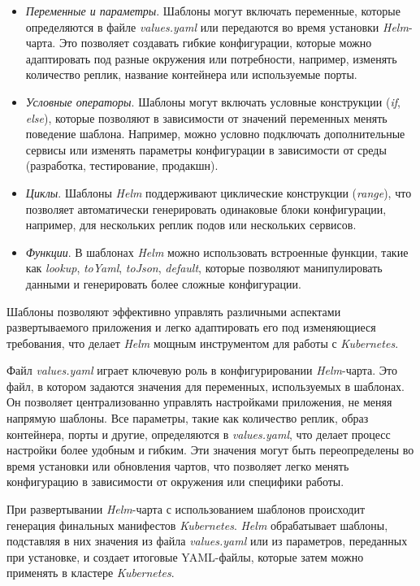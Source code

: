 \begin{itemize}
    \item \textit{Переменные и параметры}. Шаблоны могут включать переменные, которые определяются в файле \textit{values.yaml} или передаются во время установки \textit{Helm}-чарта. Это позволяет создавать гибкие конфигурации, которые можно адаптировать под разные окружения или потребности, например, изменять количество реплик, название контейнера или используемые порты.
    \item \textit{Условные операторы}. Шаблоны могут включать условные конструкции (\textit{if}, \textit{else}), которые позволяют в зависимости от значений переменных менять поведение шаблона. Например, можно условно подключать дополнительные сервисы или изменять параметры конфигурации в зависимости от среды (разработка, тестирование, продакшн).
    \item \textit{Циклы}. Шаблоны \textit{Helm} поддерживают циклические конструкции (\textit{range}), что позволяет автоматически генерировать одинаковые блоки конфигурации, например, для нескольких реплик подов или нескольких сервисов.
    \item \textit{Функции}. В шаблонах \textit{Helm} можно использовать встроенные функции, такие как \textit{lookup}, \textit{toYaml}, \textit{toJson}, \textit{default}, которые позволяют манипулировать данными и генерировать более сложные конфигурации.
\end{itemize}

Шаблоны позволяют эффективно управлять различными аспектами развертываемого приложения и легко адаптировать его под изменяющиеся требования, что делает \textit{Helm} мощным инструментом для работы с \textit{Kubernetes}.

Файл \textit{values.yaml} играет ключевую роль в конфигурировании \textit{Helm}-чарта. Это файл, в котором задаются значения для переменных, используемых в шаблонах. Он позволяет централизованно управлять настройками приложения, не меняя напрямую шаблоны. Все параметры, такие как количество реплик, образ контейнера, порты и другие, определяются в \textit{values.yaml}, что делает процесс настройки более удобным и гибким. Эти значения могут быть переопределены во время установки или обновления чартов, что позволяет легко менять конфигурацию в зависимости от окружения или специфики работы.

При развертывании \textit{Helm}-чарта с использованием шаблонов происходит генерация финальных манифестов \textit{Kubernetes}. \textit{Helm} обрабатывает шаблоны, подставляя в них значения из файла \textit{values.yaml} или из параметров, переданных при установке, и создает итоговые YAML-файлы, которые затем можно применять в кластере \textit{Kubernetes}.

